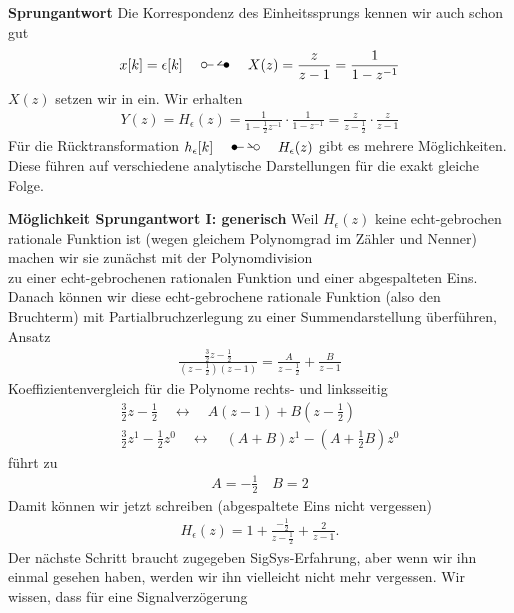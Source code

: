 \begin{ExCalc}
\textbf{Sprungantwort}
Die Korrespondenz des Einheitssprungs kennen wir auch schon gut
\begin{align}
x[k]=\epsilon[k] \quad\ztransf\quad X(z) = \frac{z}{z-1} = \frac{1}{1-z^{-1}}
\end{align}
$X(z)$ setzen wir in  ein. Wir erhalten
\begin{align}
Y(z) = H_\epsilon(z) = \frac{1}{1-\frac{1}{2} z^{-1}} \cdot \frac{1}{1-z^{-1}} =
\frac{z}{z-\frac{1}{2}} \cdot \frac{z}{z-1}
\end{align}
Für die Rücktransformation $h_\epsilon[k] \quad \Ztransf \quad H_\epsilon(z)$ gibt
es mehrere Möglichkeiten. Diese führen auf verschiedene analytische Darstellungen
für die exakt gleiche Folge.
%

\textbf{Möglichkeit Sprungantwort I: generisch}
Weil $H_\epsilon(z)$ keine echt-gebrochen rationale Funktion ist (wegen
gleichem Polynomgrad im Zähler und Nenner) machen wir sie zunächst mit der
Polynomdivision \\\quad {} \quad
zu einer echt-gebrochenen rationalen Funktion und einer abgespalteten Eins.
%
Danach können wir diese echt-gebrochene rationale Funktion (also den Bruchterm)
mit Partialbruchzerlegung zu einer Summendarstellung überführen, Ansatz
\begin{align}
\frac{\frac{3}{2}z-\frac{1}{2}}{(z-\frac{1}{2})(z-1)} = \frac{A}{z-\frac{1}{2}} + \frac{B}{z-1}
\end{align}
Koeffizientenvergleich für die Polynome rechts- und linksseitig
\begin{align}
\frac{3}{2}z-\frac{1}{2} \quad\leftrightarrow\quad A (z-1) + B (z-\frac{1}{2})\\
\frac{3}{2}z^1-\frac{1}{2}z^0 \quad\leftrightarrow\quad (A + B )z^1 - (A + \frac{1}{2} B) z^0
\end{align}
führt zu
\begin{align}
A = -\frac{1}{2}\quad B = 2
\end{align}
Damit können wir jetzt schreiben (abgespaltete Eins nicht vergessen)
\begin{align}
H_\epsilon(z) = 1 + \frac{-\frac{1}{2}}{z-\frac{1}{2}} + \frac{2}{z-1}.
\end{align}
Der nächste Schritt braucht zugegeben SigSys-Erfahrung, aber wenn wir ihn einmal gesehen haben,
werden wir ihn vielleicht nicht mehr vergessen. Wir wissen, dass für eine Signalverzögerung

\end{ExCalc}
